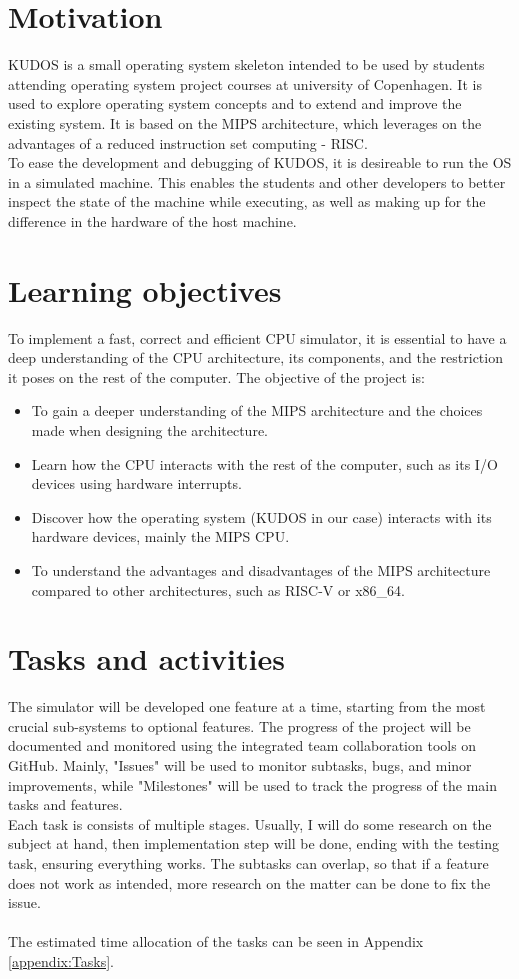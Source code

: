 \documentclass[11pt]{article}
\begin{document}
\section{Motivation}
KUDOS is a small operating system skeleton intended to be used by students
attending operating system project courses at university of Copenhagen.
It is used to explore operating system concepts and to extend and improve the
existing system.
It is based on the MIPS architecture, which leverages on the advantages of a
reduced instruction set computing - RISC.\\
To ease the development and debugging of KUDOS, it is desireable to run the OS
in a simulated machine. This enables the students and other developers to
better inspect the state of the machine while executing, as well as making up
for the difference in the hardware of the host machine.

\section{Learning objectives}
To implement a fast, correct and efficient CPU simulator, it is essential
to have a deep understanding of the CPU architecture, its components, and
the restriction it poses on the rest of the computer.
The objective of the project is:
\begin{itemize}
\item To gain a deeper understanding of the MIPS architecture and the choices
made when
designing the architecture.
\item Learn how the CPU interacts with the rest of the computer, such as
its I/O devices using hardware interrupts.
\item Discover how the operating system (KUDOS in our case) interacts with
its hardware
devices, mainly the MIPS CPU.
\item To understand the advantages and disadvantages of the MIPS architecture
compared to other architectures, such as RISC-V or x86\_64.
\end{itemize}

\section{Tasks and activities}
The simulator will be developed one feature at a time, starting from the
most crucial sub-systems to optional features. The progress of the project
will be documented and monitored  using the integrated team collaboration
tools on GitHub. Mainly, "Issues" will be used to monitor subtasks, bugs,
and minor improvements, while "Milestones" will be used to track the progress
of the main tasks and features.\\
Each task is consists of multiple stages. Usually, I will do some research
on the subject at hand, then implementation step will be done, ending with
the testing task, ensuring everything works. The subtasks can overlap, so
that if a feature does not work as intended, more research on the matter
can be done to fix the issue.\\\\
The estimated time allocation of the tasks can be seen in Appendix
\ref{appendix:Tasks}.
\end{document}
